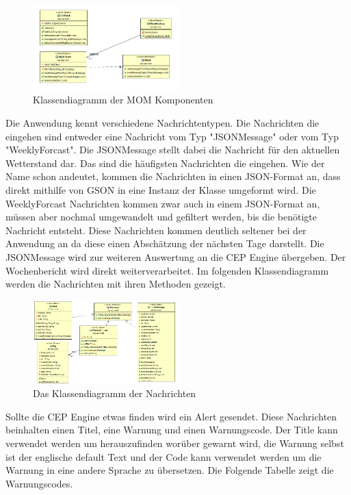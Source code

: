 \begin{figure}[htbp]
	\centering
	\includegraphics[width=0.5\textwidth]{Bilder/MoMKomponents.png}
	\caption{Klassendiagramm der MOM Komponenten}
	\label{img:MoMDiagramm}
\end{figure} 
Die Anwendung kennt verschiedene Nachrichtentypen. Die Nachrichten die eingehen sind entweder eine Nachricht vom Typ "JSONMessage" oder vom Typ "WeeklyForcast". Die JSONMessage stellt dabei die Nachricht für den aktuellen Wetterstand dar. Das sind die häufigsten Nachrichten die eingehen. Wie der Name schon andeutet, kommen die Nachrichten in einen JSON-Format an, dass direkt mithilfe von GSON in eine Instanz der Klasse umgeformt wird. Die WeeklyForcast Nachrichten kommen zwar auch in einem JSON-Format an, müssen aber nochmal umgewandelt und gefiltert werden, bis die benötigte Nachricht entsteht. Diese Nachrichten kommen deutlich seltener bei der Anwendung an da diese einen Abschätzung der nächsten Tage darstellt. Die JSONMessage wird zur weiteren Auswertung an die CEP Engine übergeben. Der Wochenbericht wird direkt weiterverarbeitet. Im folgenden Klassendiagramm werden die Nachrichten mit ihren Methoden gezeigt. 
\begin{figure}[htbp]
	\centering
	\includegraphics[width=0.5\textwidth]{Bilder/News.png}
	\caption{Das Klassendiagramm der Nachrichten}
	\label{img:eventDiagramm}
\end{figure} 
Sollte die CEP Engine etwas finden wird ein Alert gesendet. Diese Nachrichten beinhalten einen Titel, eine Warnung und einen Warnungscode. Der Title kann verwendet werden um herauszufinden worüber gewarnt wird, die Warnung selbst ist der englische default Text und der Code kann verwendet werden um die Warnung in eine andere Sprache zu übersetzen.  Die Folgende Tabelle zeigt die Warnungscodes. 
